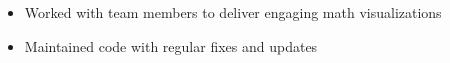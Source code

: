 \documentclass[10pt]{article}
\begin{document}

	\begin{itemize}[noitemsep]
		\item Worked with team members to deliver engaging math visualizations
	\end{itemize}


	\begin{itemize}[noitemsep]
		\item Maintained code with regular fixes and updates
	\end{itemize}
\end{document}
